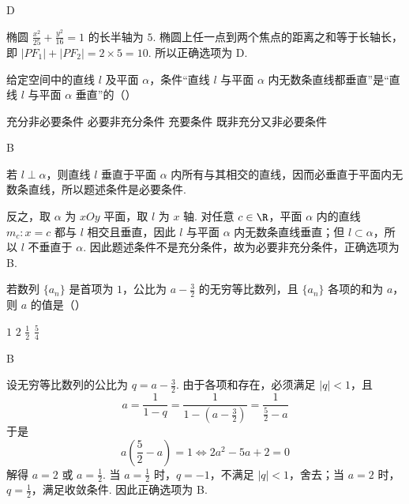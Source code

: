 \begin{answer}
D
\end{answer}

\begin{solution}
椭圆 \(\frac{x^2}{25}+\frac{y^2}{16}=1\) 的长半轴为 \(5\). 椭圆上任一点到两个焦点的距离之和等于长轴长，即
\(|PF_1|+|PF_2|=2\times5=10\).
所以正确选项为 D.
\end{solution}

\begin{problem}
给定空间中的直线 \(l\) 及平面 \(\alpha\)，条件“直线 \(l\) 与平面 \(\alpha\) 内无数条直线都垂直”是“直线 \(l\) 与平面 \(\alpha\) 垂直”的（\quad）

\choices
    {充分非必要条件}
    {必要非充分条件}
    {充要条件}
    {既非充分又非必要条件}
\end{problem}

\begin{answer}
B
\end{answer}

\begin{solution}
若 \(l\perp\alpha\)，则直线 \(l\) 垂直于平面 \(\alpha\) 内所有与其相交的直线，因而必垂直于平面内无数条直线，所以题述条件是必要条件.

反之，取 \(\alpha\) 为 \(xOy\) 平面，取 \(l\) 为 \(x\) 轴. 对任意 \(c\in\R\)，平面 \(\alpha\) 内的直线 \(m_c\colon x=c\) 都与 \(l\) 相交且垂直，因此 \(l\) 与平面 \(\alpha\) 内无数条直线垂直；但 \(l\subset\alpha\)，所以 \(l\) 不垂直于 \(\alpha\). 因此题述条件不是充分条件，故为必要非充分条件，正确选项为 B.
\end{solution}

\begin{problem}
若数列 \(\{a_{n}\}\) 是首项为 \(1\)，公比为 \(a - \frac{3}{2}\) 的无穷等比数列，且 \(\{a_{n}\}\) 各项的和为 \(a\)，则 \(a\) 的值是（\quad）

\choices
    {\(1\)}
    {\(2\)}
    {\( \frac{1}{2} \)}
    {\( \frac{5}{4} \)}
\end{problem}

\begin{answer}
B
\end{answer}

\begin{solution}
设无穷等比数列的公比为 \(q=a-\frac32\). 由于各项和存在，必须满足 \(|q|<1\)，且
\[
a=\frac{1}{1-q}=\frac{1}{1-(a-\frac32)}=\frac{1}{\frac52-a}
\]
于是
\[
a\left(\frac52-a\right)=1
\Longleftrightarrow 2a^2-5a+2=0
\]
解得 \(a=2\) 或 \(a=\frac12\). 当 \(a=\frac12\) 时，\(q=-1\)，不满足 \(|q|<1\)，舍去；当 \(a=2\) 时，\(q=\frac12\)，满足收敛条件. 因此正确选项为 B.
\end{solution}

